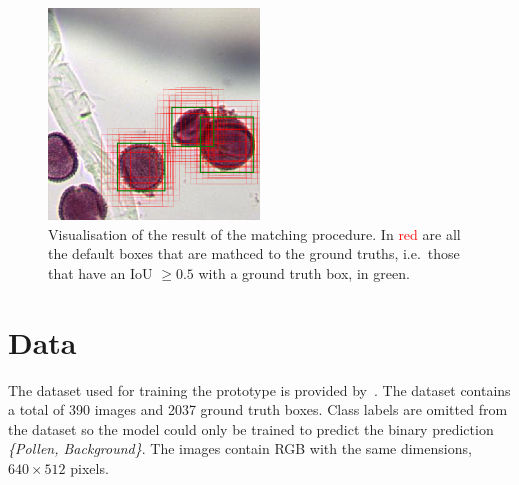 \begin{figure}[htb]
  \centering
  \includegraphics[width=0.5\textwidth]{figs/priors_matching}
  \caption[Default box mathching]{Visualisation of the result of the matching procedure.
In \textcolor{red}{red} are all the default boxes that are mathced to the ground truths, i.e.~those that have an IoU \( \geq 0.5 \) with a ground truth box, in \textcolor{nicegreen}{green}.}\label{fig:priors}
\end{figure}


\section*{Data}
The dataset used for training the prototype is provided by~\cite{gallardo_caballero_precise_2019}.
The dataset contains a total of 390 images and 2037 ground truth boxes.
Class labels are omitted from the dataset so the model could only be trained to predict the binary prediction \textit{\{Pollen, Background\}}.
The images contain RGB with the same dimensions, \( 640\times 512 \) pixels.

